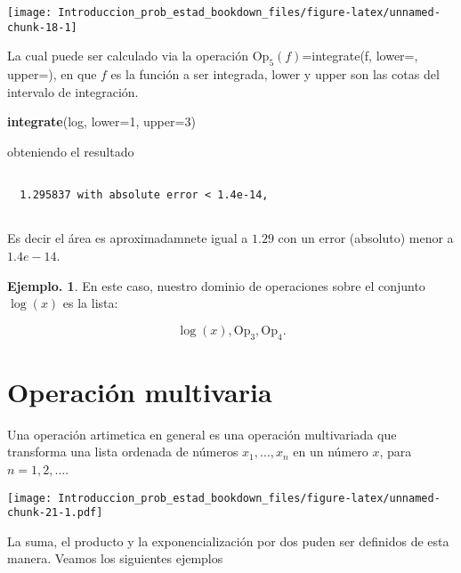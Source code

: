 \documentclass[]{book}
\newenvironment{Shaded}{\begin{snugshade}}{\end{snugshade}}
\newcommand{\DataTypeTok}[1]{\textcolor[rgb]{0.13,0.29,0.53}{#1}}
\newcommand{\DecValTok}[1]{\textcolor[rgb]{0.00,0.00,0.81}{#1}}
\newcommand{\KeywordTok}[1]{\textcolor[rgb]{0.13,0.29,0.53}{\textbf{#1}}}
\newcommand{\NormalTok}[1]{#1}
\theoremstyle{definition}
\theoremstyle{definition}
\newtheorem{example}{Ejemplo.}[chapter]
\theoremstyle{definition}
\theoremstyle{remark}
\begin{document}
\begin{center}\texttt{[image: Introduccion\_prob\_estad\_bookdown\_files/figure-latex/unnamed-chunk-18-1]} \end{center}

La cual puede ser calculado via la operación
\(\mbox{Op}_5(f)\)=integrate(f, lower=, upper=), en que \(f\) es la
función a ser integrada, lower y upper son las cotas del
intervalo de integración.

\begin{Shaded}
\begin{Highlighting}[]
  \KeywordTok{integrate}\NormalTok{(log, }\DataTypeTok{lower=}\DecValTok{1}\NormalTok{, }\DataTypeTok{upper=}\DecValTok{3}\NormalTok{)}
\end{Highlighting}
\end{Shaded}

obteniendo el resultado

\begin{verbatim}

  1.295837 with absolute error < 1.4e-14,
  
\end{verbatim}

Es decir el área es aproximadamnete igual a \(1.29\) con un error
(absoluto) menor a \(1.4e-14\).

\begin{example}
\protect\hypertarget{exm:unnamed-chunk-20}{}{\label{exm:unnamed-chunk-20} }
En este caso, nuestro dominio de operaciones sobre el conjunto
\(\log(x)\) es la lista:

\[   \log(x), \mbox{Op}_3, \mbox{Op}_4.    \]
\end{example}

\hypertarget{operaciuxf3n-multivaria}{%
\section*{Operación multivaria}\label{operaciuxf3n-multivaria}}

Una operación artimetica en general es una operación multivariada
que transforma una lista ordenada de números \(x_1, \ldots, x_n\) en un
número \(x\), para \(n=1,2,...\).

\texttt{[image: Introduccion\_prob\_estad\_bookdown\_files/figure-latex/unnamed-chunk-21-1.pdf]}

La suma, el producto y la
exponencialización por dos puden ser
definidos de esta manera. Veamos los siguientes ejemplos
\end{document}
